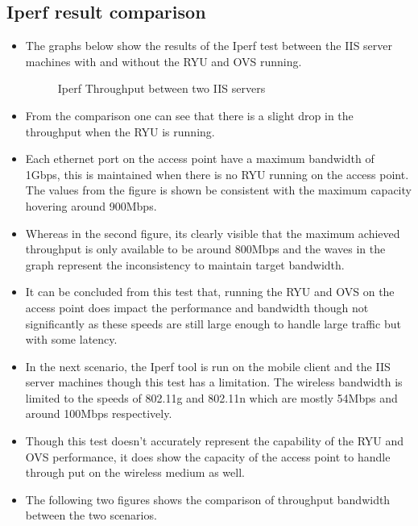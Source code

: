 \subsection{Iperf result comparison}
\begin{itemize}
	\item The graphs below show the results of the Iperf test between the IIS server machines with and without the RYU and OVS running.
	\begin{figure}[H]
		\centering
		\hfill
		\caption{Iperf Throughput between two IIS servers}
	\end{figure}
	\item From the comparison one can see that there is a slight drop in the throughput when the RYU is running.
	\item Each ethernet port on the access point have a maximum bandwidth of 1Gbps, this is maintained when there is no RYU running on the access point. The values from the figure is shown be consistent with the maximum capacity hovering around 900Mbps.
	\item Whereas in the second figure, its clearly visible that the maximum achieved throughput is only available to be around 800Mbps and the waves in the graph represent the inconsistency to maintain target bandwidth.
	\item It can be concluded from this test that, running the RYU and OVS on the access point does impact the performance and bandwidth though not significantly as these speeds are still large enough to handle large traffic but with some latency.
	\item In the next scenario, the Iperf tool is run on the mobile client and the IIS server machines though this test has a limitation. The wireless bandwidth is limited to the speeds of 802.11g and 802.11n which are mostly 54Mbps and around 100Mbps respectively.
	\item Though this test doesn’t accurately represent the capability of the RYU and OVS performance, it does show the capacity of the access point to handle through put on the wireless medium as well.
	\item The following two figures shows the comparison of throughput bandwidth between the two scenarios.

\end{itemize}
